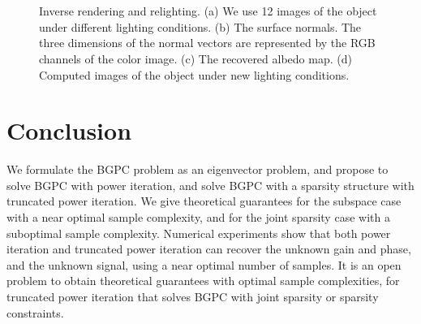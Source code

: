 \documentclass[11pt,journal]{IEEEtran}
\begin{document}
\begin{figure}[htbp]%
\centering
{} \\
 \\
\caption{Inverse rendering and relighting. (a) We use 12 images of the object under different lighting conditions. (b) The surface normals. The three dimensions of the normal vectors are represented by the RGB channels of the color image. (c) The recovered albedo map. (d) Computed images of the object under new lighting conditions.}%
\label{fig:cat}%
\end{figure}

\section{Conclusion} \label{sec:conclusion}

We formulate the BGPC problem as an eigenvector problem, and propose to solve BGPC with power iteration, and solve BGPC with a sparsity structure with truncated power iteration. We give theoretical guarantees for the subspace case with a near optimal sample complexity, and for the joint sparsity case with a suboptimal sample complexity. 
Numerical experiments show that both power iteration and truncated power iteration can recover the unknown gain and phase, and the unknown signal, using a near optimal number of samples. 
It is an open problem to obtain theoretical guarantees with optimal sample complexities, for truncated power iteration that solves BGPC with joint sparsity or sparsity constraints.





\appendix
\end{document}
